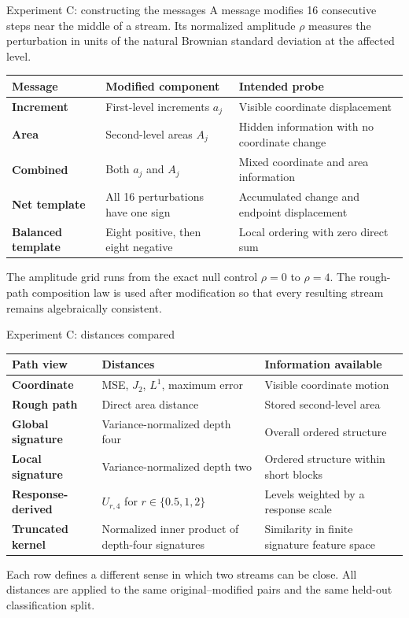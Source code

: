 \documentclass[aspectratio=169,9pt]{beamer}
\begin{document}
\begin{frame}{Experiment C: constructing the messages}
  \small
  A message modifies 16 consecutive steps near the middle of a stream. Its normalized amplitude $\rho$ measures the perturbation in units of the natural Brownian standard deviation at the affected level.

  \begin{tabular}{>{\bfseries}p{}p{}p{}}
    \toprule
    Message & Modified component & Intended probe \\
    \midrule
    Increment & First-level increments $a_j$ & Visible coordinate displacement \\
    Area & Second-level areas $A_j$ & Hidden information with no coordinate change \\
    Combined & Both $a_j$ and $A_j$ & Mixed coordinate and area information \\
    \midrule
    Net template & All 16 perturbations have one sign & Accumulated change and endpoint displacement \\
    Balanced template & Eight positive, then eight negative & Local ordering with zero direct sum \\
    \bottomrule
  \end{tabular}

  The amplitude grid runs from the exact null control $\rho=0$ to $\rho=4$. The rough-path composition law is used after modification so that every resulting stream remains algebraically consistent.
\end{frame}

\begin{frame}{Experiment C: distances compared}
  \small
  \begin{tabular}{>{\bfseries}p{}p{}p{}}
    \toprule
    Path view & Distances & Information available \\
    \midrule
    Coordinate & MSE, $J_2$, $L^1$, maximum error & Visible coordinate motion \\
    Rough path & Direct area distance & Stored second-level area \\
    Global signature & Variance-normalized depth four & Overall ordered structure \\
    Local signature & Variance-normalized depth two & Ordered structure within short blocks \\
    Response-derived & $U_{r,4}$ for $r\in\{0.5,1,2\}$ & Levels weighted by a response scale \\
    Truncated kernel & Normalized inner product of depth-four signatures & Similarity in finite signature feature space \\
    \bottomrule
  \end{tabular}

  Each row defines a different sense in which two streams can be close. All distances are applied to the same original--modified pairs and the same held-out classification split.
\end{frame}
\end{document}
